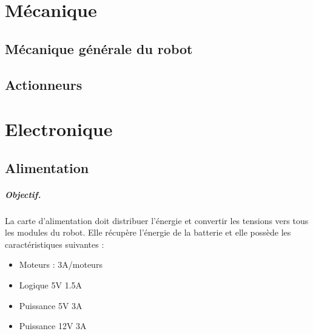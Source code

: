 \documentclass[a4paper,10pt]{report}
\begin{document}
\begin{spacing}{1.5}
\chapter{Mécanique}
\section{Mécanique générale du robot}
\section{Actionneurs}

\chapter{Electronique}
\section{Alimentation}
\paragraph{Objectif.} La carte d'alimentation doit distribuer l'énergie et
convertir les tensions vers tous les modules du robot. Elle récupère l'énergie
de la batterie et elle possède les caractéristiques suivantes :
\begin{itemize}
\item Moteurs : 3A/moteurs
\item Logique 5V 1.5A
\item Puissance 5V 3A
\item Puissance 12V 3A
\end{itemize}

\end{spacing}
\end{document}
